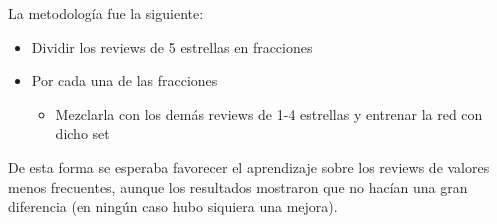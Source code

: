 La metodolog\'ia fue la siguiente:

\begin{itemize}
\setlength\itemsep{0em}
  \item Dividir los reviews de 5 estrellas en fracciones
  \item Por cada una de las fracciones
  \begin{itemize}
  \setlength\itemsep{0em}
    \item Mezclarla con los dem\'as reviews de 1-4 estrellas y entrenar la red con dicho set
  \end{itemize}
\end{itemize}

De esta forma se esperaba favorecer el aprendizaje sobre los reviews de valores menos frecuentes,
aunque los resultados mostraron que no hac\'ian una gran diferencia (en ning\'un caso hubo
siquiera una mejora).
